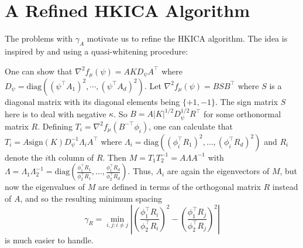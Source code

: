 \documentclass[jmlr]{article}
\theoremstyle{definition}
\begin{document}
\section{A Refined HKICA Algorithm}
\label{sec:DICA}

The problems with $\gamma_A$ motivate us to refine the HKICA algorithm.
The idea is inspired by \citet{arora2012provable} and \citet{frieze1996learning} using a quasi-whitening procedure:

One can show that $\nabla^2 f_\mu(\psi)=A K D_{\psi} A^\top$ where $D_{\psi}=\text{diag}\left((\psi^{\top}A_1)^2,\cdots, (\psi^{\top}A_d)^2\right)$. Let $\nabla^2 f_\mu(\psi) = BSB^{\top}$ where $S$ is a diagonal matrix with its diagonal elements being $\{+1, -1\}$. The sign matrix $S$ here is to deal with negative $\kappa$.
So $B=A|K|^{1/2}D_{\psi}^{1/2}R^{\top}$ for some orthonormal matrix $R$. Defining $T_i=\nabla^2 f_\mu(B^{-\top} \phi_i)$, one can calculate that
$T_i=A \text{sign}(K) D_\psi^{-1} \Lambda_i A^\top$ where $\Lambda_i=\text{diag}\left((\phi_i^\top R_1)^2,\ldots,(\phi_i^\top R_d)^2 \right) $ and $R_i$ denote the $i$th column of $R$.
Then $M=T_1 T_2^{-1} = A\Lambda A^{-1}$ with $\Lambda=\Lambda_1 \Lambda_2^{-1}=\text{diag}\left(\frac{\phi_1^\top R_1}{\phi_2^\top R_1},\ldots,\frac{\phi_1^\top R_d}{\phi_2^\top R_d}\right)$. Thus, $A_i$ are again the eigenvectors of $M$, but now the eigenvalues of $M$ are defined in terms of the orthogonal matrix $R$ instead of $A$,
and so the resulting minimum spacing
\begin{equation}
\label{def:gammaR}
\gamma_R =  \min_{i,j: i\neq j} \left\vert \left(\frac{\phi_1^{\top}R_i}{\phi_2^{\top}R_i}\right)^2 - \left(\frac{\phi_1^{\top}R_j}{\phi_2^{\top}R_j}\right)^2 \right\vert
\end{equation}
is much easier to handle.
\end{document}
